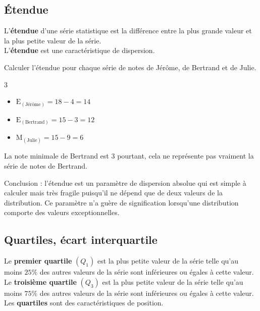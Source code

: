 \subsection{Étendue}

\begin{Définition}
L'{\bf{étendue}} d'une série statistique est la différence entre la plus grande valeur et la plus petite valeur de la série. \\
L'{\bf{étendue}} est une caractéristique de dispersion.

\end{Définition}

\noindent Calculer l'étendue pour chaque série de notes de Jérôme, de Bertrand et de Julie.

\begin{multicols}{3}
\begin{itemize}[label=\textbullet]
\item  $\text{E}_{(\text{Jérôme})} =18-4=14$
\item $\text{E}_{(\text{Bertrand})} =15-3=12 $
\item $\text{M}_{(\text{Julie})} =15-9=6$
\end{itemize}
\end{multicols}

La note minimale de Bertrand est $3$ pourtant, cela ne représente pas vraiment la série de notes de Bertrand. 



\begin{Remarque}
Conclusion : l'étendue est un paramètre de dispersion absolue qui est simple à calculer mais très fragile puisqu'il ne dépend que de deux valeurs de la distribution. Ce paramètre n'a guère de signification lorsqu'une distribution comporte des valeurs exceptionnelles. 
\end{Remarque}

\newpage

\subsection{Quartiles, écart interquartile}
\begin{Définition}
Le {\bf{premier quartile}}  $(Q_1)$ est la plus petite valeur de la série telle qu'au moins $25 \%$ des autres valeurs de la série sont inférieures ou égales à cette valeur.\\
Le  {\bf{troisième quartile}} $(Q_3)$ est la plus petite valeur de la série telle qu'au moins $75 \%$ des autres valeurs de la série sont inférieures ou égales à cette valeur.\\
Les {\bf{quartiles}} sont des caractéristiques de position.

\end{Définition}

